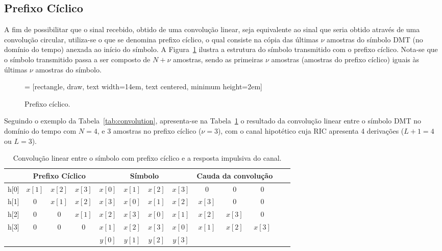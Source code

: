 \subsection{Prefixo Cíclico}
\label{sec:prefixo_ciclico_teorico}

A fim de possibilitar que o sinal recebido, obtido de uma convolução linear, seja equivalente ao sinal que seria obtido através de uma convolução circular, utiliza-se o que se denomina prefixo cíclico, o qual consiste na cópia das últimas $\nu$ amostras do símbolo DMT (no domínio do tempo) anexada ao início do símbolo. A Figura~\ref{fig:pref_cicl} ilustra a estrutura do símbolo transmitido com o prefixo cíclico. Nota-se que o símbolo transmitido passa a ser composto de $N + \nu$ amostras, sendo as primeiras $\nu$ amostras (amostras do prefixo cíclico) iguais às últimas $\nu$ amostras do símbolo.

\begin{figure}[htbp]
\centering
 = [rectangle, draw, text width=14em, text centered, minimum height=2em]
\caption{Prefixo cíclico.}
\label{fig:pref_cicl}
\end{figure}

Seguindo o exemplo da Tabela~\ref{tab:convolution}, apresenta-se na Tabela~\ref{tab:convolution_cp} o resultado da convolução linear entre o símbolo DMT no domínio do tempo com $N = 4$, e 3 amostras no prefixo cíclico ($\nu = 3$), com o canal hipotético cuja RIC apresenta 4 derivações ($L + 1 = 4$ ou $L = 3$).

\begin{table}[htbp]
\centering
\begin{tabular}{c | c c c |c c c c| c c c c c}
\hline
& \multicolumn{3}{|c|}{Prefixo Cíclico} & \multicolumn{4}{|c|}{Símbolo} & \multicolumn{3}{|c|}{Cauda da convolução} \\
\hline
h[0] & $x[1]$ & $x[2]$ & $x[3]$ & $x[0]$ & $x[1]$ & $x[2]$ & $x[3]$ & 0 & 0 & 0 \\
h[1] & 0 & $x[1]$ & $x[2]$ & $x[3]$ & $x[0]$ & $x[1]$ & $x[2]$ &  $x[3]$ & 0 & 0 \\
h[2] & 0 & 0 & $x[1]$ & $x[2]$ & $x[3]$ & $x[0]$ & $x[1]$ & $x[2]$ & $x[3]$ & 0\\
h[3] & 0 & 0 & 0 & $x[1]$ & $x[2]$ & $x[3]$ & $x[0]$ & $x[1]$ & $x[2]$ &  $x[3]$\\
\hline
&  &  &  & $y[0]$ & $y[1]$ & $y[2]$ & $y[3]$ & &
\end{tabular}
\caption{Convolução linear entre o símbolo com prefixo cíclico e a resposta impulsiva do canal.}
\label{tab:convolution_cp}
\end{table}

